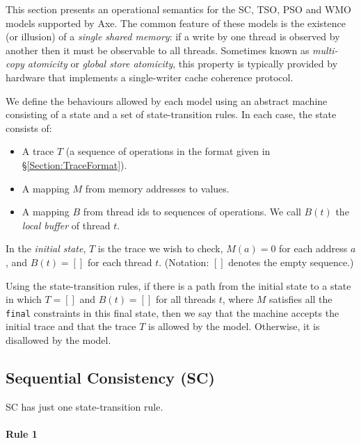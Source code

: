 \documentclass[11pt]{article}
\begin{document}
This section presents an operational semantics for the SC, TSO, PSO
and WMO models supported by Axe.  The common feature of these models
is the existence (or illusion) of a \emph{single shared memory}: if a
write by one thread is observed by another then it must be observable
to all threads.  Sometimes known as \emph{multi-copy atomicity} or
\emph{global store atomicity}, this property is typically provided by
hardware that implements a single-writer cache coherence protocol.

We define the behaviours allowed by each model using an abstract
machine consisting of a state and a set of state-transition rules.  In
each case, the state consists of:

\begin{itemize}

\item A trace $T$ (a sequence of operations in the format given in
\S\ref{Section:TraceFormat}).

\item A mapping $M$ from memory addresses to values.

\item A mapping $B$ from thread ids to sequences of operations.  We
call $B(t)$ the \emph{local buffer} of thread $t$.

\end{itemize}

In the \emph{initial state}, $T$ is the trace we wish to check, $M(a)
= 0$ for each address $a$, and $B(t) = []$ for each thread $t$.
(Notation: $[]$ denotes the empty sequence.)

Using the state-transition rules, if there is a path from the initial
state to a state in which $T = []$ and $B(t) = []$ for all threads
$t$, where $M$ satisfies all the \verb#final# constraints in this
final state, then we say that the machine accepts the initial trace
and that the trace $T$ is allowed by the model.  Otherwise, it is
disallowed by the model.

\subsection{Sequential Consistency (SC)}

SC has just one state-transition rule.

\paragraph{Rule 1}
\end{document}
